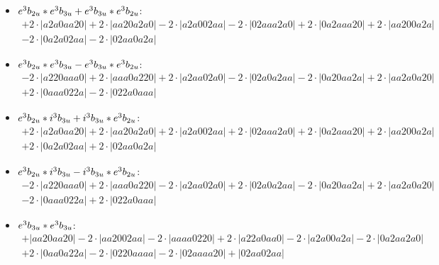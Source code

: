 \documentclass{article}
\begin{document}
\begin{itemize}
$$\begin{array}{c}
\end{array}$$
\item \boldmath$e^3 b_{2u} * e^3 b_{3u} + e^3 b_{3u} * e^3 b_{2u} \displaystyle $\unboldmath : \quad$$\begin{array}{c}
+2 \cdot \left|a2a0aa20\right| +2 \cdot \left|aa20a2a0\right| -2 \cdot \left|a2a002aa\right| -2 \cdot \left|02aaa2a0\right| +2 \cdot \left|0a2aaa20\right| +2 \cdot \left|aa200a2a\right| \\[0.5cm] -2 \cdot \left|0a2a02aa\right| -2 \cdot \left|02aa0a2a\right|
\end{array}$$
\item \boldmath$e^3 b_{2u} * e^3 b_{3u} - e^3 b_{3u} * e^3 b_{2u} \displaystyle $\unboldmath : \quad$$\begin{array}{c}
-2 \cdot \left|a220aaa0\right| +2 \cdot \left|aaa0a220\right| +2 \cdot \left|a2aa02a0\right| -2 \cdot \left|02a0a2aa\right| -2 \cdot \left|0a20aa2a\right| +2 \cdot \left|aa2a0a20\right| \\[0.5cm] +2 \cdot \left|0aaa022a\right| -2 \cdot \left|022a0aaa\right|
\end{array}$$
\item \boldmath$e^3 b_{2u} * i^3 b_{3u} + i^3 b_{3u} * e^3 b_{2u} \displaystyle $\unboldmath : \quad$$\begin{array}{c}
+2 \cdot \left|a2a0aa20\right| +2 \cdot \left|aa20a2a0\right| +2 \cdot \left|a2a002aa\right| +2 \cdot \left|02aaa2a0\right| +2 \cdot \left|0a2aaa20\right| +2 \cdot \left|aa200a2a\right| \\[0.5cm] +2 \cdot \left|0a2a02aa\right| +2 \cdot \left|02aa0a2a\right|
\end{array}$$
\item \boldmath$e^3 b_{2u} * i^3 b_{3u} - i^3 b_{3u} * e^3 b_{2u} \displaystyle $\unboldmath : \quad$$\begin{array}{c}
-2 \cdot \left|a220aaa0\right| +2 \cdot \left|aaa0a220\right| -2 \cdot \left|a2aa02a0\right| +2 \cdot \left|02a0a2aa\right| -2 \cdot \left|0a20aa2a\right| +2 \cdot \left|aa2a0a20\right| \\[0.5cm] -2 \cdot \left|0aaa022a\right| +2 \cdot \left|022a0aaa\right|
\end{array}$$
\item \boldmath$e^3 b_{3u} * e^3 b_{3u} \displaystyle $\unboldmath : \quad$$\begin{array}{c}
+\left|aa20aa20\right| -2 \cdot \left|aa2002aa\right| -2 \cdot \left|aaaa0220\right| +2 \cdot \left|a22a0aa0\right| -2 \cdot \left|a2a00a2a\right| -2 \cdot \left|0a2aa2a0\right| \\[0.5cm] +2 \cdot \left|0aa0a22a\right| -2 \cdot \left|0220aaaa\right| -2 \cdot \left|02aaaa20\right| +\left|02aa02aa\right|

\end{array}$$
\end{itemize}
\end{document}

